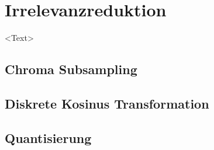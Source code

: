 \chapter{Irrelevanzreduktion}
\label{kap:Irrelevanzreduktion}
<Text>
\section{Chroma Subsampling}

\section{Diskrete Kosinus Transformation}

\section{Quantisierung}